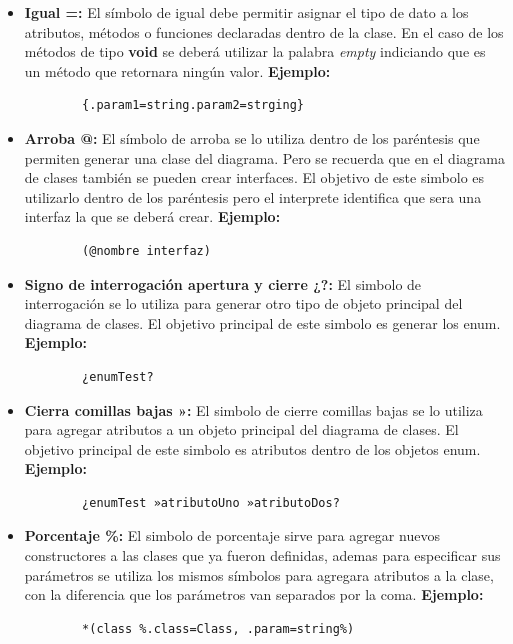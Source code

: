 \begin{itemize}
	\item \textbf{Igual =:} El símbolo de igual debe permitir asignar el tipo de dato a los atributos, métodos o funciones declaradas dentro de la clase. En el caso de los métodos de tipo \textbf{void}  se deberá utilizar la palabra \textit{empty} indiciando que es un método que retornara ningún valor. \textbf{Ejemplo:}
	
	\begin{verbatim}
		{.param1=string.param2=strging}
	\end{verbatim}
	
	\item \textbf{Arroba @:} El símbolo de arroba se lo utiliza dentro de los paréntesis que permiten generar una clase del diagrama. Pero se recuerda que en el diagrama de clases también se pueden crear interfaces. El objetivo de este simbolo es utilizarlo dentro de los paréntesis pero el interprete identifica que sera una interfaz la que se deberá crear. \textbf{Ejemplo:}
	  
	\begin{verbatim}
		(@nombre interfaz)
	\end{verbatim}

	\item  \textbf{Signo de interrogación apertura y cierre ¿?:} El simbolo de interrogación se lo utiliza para generar otro tipo de objeto principal del diagrama de clases. El objetivo principal de este simbolo es generar los enum. \textbf{Ejemplo:}
	
	\begin{verbatim}
		¿enumTest?
	\end{verbatim}

	\item \textbf{Cierra comillas bajas »:} El simbolo de cierre comillas bajas se lo utiliza para agregar atributos a un objeto principal del diagrama de clases. El objetivo principal de este simbolo es atributos dentro de los objetos enum. \textbf{Ejemplo:}
	
	\begin{verbatim}
		¿enumTest »atributoUno »atributoDos?
	\end{verbatim}

	\item \textbf{Porcentaje \%:} El simbolo de porcentaje sirve para agregar nuevos constructores a las clases que ya fueron definidas, ademas para especificar sus parámetros se utiliza los mismos símbolos para agregara atributos a la clase, con la diferencia que los parámetros van separados por la coma. \textbf{Ejemplo:}
	
	\begin{verbatim}
		*(class %.class=Class, .param=string%)
	\end{verbatim}
	  
\end{itemize}

